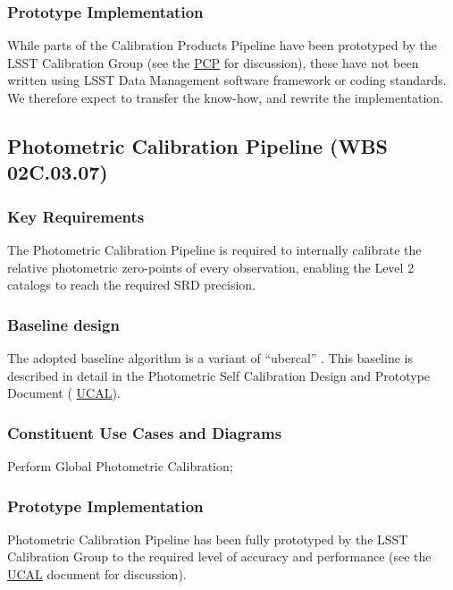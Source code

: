 \documentclass[12pt]{article}
\newcommand{\ds}[2]{{\color{blue} \href{https://docushare.lsstcorp.org/docushare/dsweb/Get/#1}{#2}}\xspace}
\newcommand{\PCP}{\ds{Document-8123}{PCP}}
\newcommand{\UCAL}{\ds{Document-15125}{UCAL}}
\newcommand{\wbsPhotoCal}{WBS 02C.03.07}
\begin{document}
\subsubsection{Prototype Implementation}

While parts of the Calibration Products Pipeline have been prototyped by the LSST Calibration Group (see the \PCP for discussion), these have not been written using LSST Data Management software framework or coding standards. We therefore expect to transfer the know-how, and rewrite the implementation.

\clearpage

\subsection{Photometric Calibration Pipeline (\wbsPhotoCal)}

\subsubsection{Key Requirements}

The Photometric Calibration Pipeline is required to internally calibrate the relative photometric zero-points of every observation, enabling the Level 2 catalogs to reach the required SRD precision.

\subsubsection{Baseline design}

The adopted baseline algorithm is a variant of ``ubercal'' \cite{Padmanabhan08, Schlafly12}. This baseline is described in detail in the Photometric Self Calibration Design and Prototype Document (\UCAL).

\subsubsection{Constituent Use Cases and Diagrams}

Perform Global Photometric Calibration;

\subsubsection{Prototype Implementation}

Photometric Calibration Pipeline has been fully prototyped by the LSST Calibration Group to the required level of accuracy and performance (see the \UCAL document for discussion). %
\\
\end{document}
